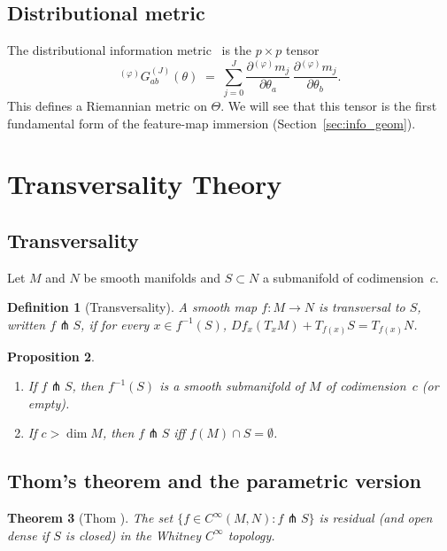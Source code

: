\documentclass[11pt,a4paper]{article}
\newtheorem{theorem}{Theorem}[section]
\newtheorem{proposition}[theorem]{Proposition}
\newtheorem{definition}[theorem]{Definition}
\newcommand{\wm}[1]{{}^{(\varphi)}\!m_{#1}}
\newcommand{\wG}{{}^{(\varphi)}\!G}
\begin{document}
\subsection{Distributional metric}

The distributional information metric~\cite{C,E} is the $p\times p$
tensor
\[
  \wG_{ab}^{(J)}(\theta)
  \;=\;
  \sum_{j=0}^{J}
  \frac{\partial \wm{j}}{\partial\theta_a}\,
  \frac{\partial \wm{j}}{\partial\theta_b}.
\]
This defines a Riemannian metric on $\Theta$.  We will see that this
tensor is the first fundamental form of the feature-map immersion
(Section~\ref{sec:info_geom}).


\section{Transversality Theory}
\label{sec:transversality}

\subsection{Transversality}

Let $M$ and $N$ be smooth manifolds and $S\subset N$ a submanifold
of codimension~$c$.

\begin{definition}[Transversality]
\label{def:transversality}
A smooth map $f:M\to N$ is \emph{transversal} to $S$, written
$f\pitchfork S$, if for every $x\in f^{-1}(S)$,
$Df_x(T_x M) + T_{f(x)} S = T_{f(x)} N$.
\end{definition}

\begin{proposition}
\label{prop:consequences}
\begin{enumerate}[label=\textnormal{(\alph*)}]
\item If $f\pitchfork S$, then $f^{-1}(S)$ is a smooth submanifold
  of $M$ of codimension~$c$ (or empty).
\item If $c > \dim M$, then $f\pitchfork S$ iff $f(M)\cap S =
  \emptyset$.
\end{enumerate}
\end{proposition}

\subsection{Thom's theorem and the parametric version}

\begin{theorem}[Thom {\cite{Thom1954}}]
\label{thm:thom}
The set $\{f\in C^\infty(M,N) : f\pitchfork S\}$ is residual (and
open dense if $S$ is closed) in the Whitney $C^\infty$ topology.
\end{theorem}
\end{document}
